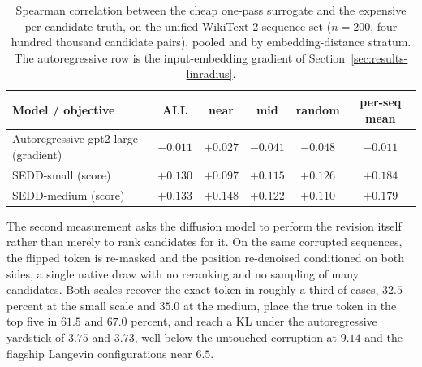\begin{table}[htbp]
    \centering
    \small
    \setlength{\tabcolsep}{4pt}
    \begin{tabular}{lccccc}
        \toprule
        Model / objective & ALL & near & mid & random & per-seq mean \\
        \midrule
        Autoregressive gpt2-large (gradient) & $-0.011$ & $+0.027$ & $-0.041$ & $-0.048$ & $-0.011$ \\
        SEDD-small (score) & $+0.130$ & $+0.097$ & $+0.115$ & $+0.126$ & $+0.184$ \\
        SEDD-medium (score) & $+0.133$ & $+0.148$ & $+0.122$ & $+0.110$ & $+0.179$ \\
        \bottomrule
    \end{tabular}
    \caption[Linearization correlation, autoregressive gradient against diffusion score.]{Spearman correlation between the cheap one-pass surrogate and the expensive per-candidate truth, on the unified WikiText-2 sequence set ($n=200$, four hundred thousand candidate pairs), pooled and by embedding-distance stratum. The autoregressive row is the input-embedding gradient of Section~\ref{sec:results-linradius}.}
    \label{tab:diffusion-lin}
\end{table}

The second measurement asks the diffusion model to perform the revision itself rather than merely to rank candidates for it. On the same corrupted sequences, the flipped token is re-masked and the position re-denoised conditioned on both sides, a single native draw with no reranking and no sampling of many candidates. Both scales recover the exact token in roughly a third of cases, $32.5$ percent at the small scale and $35.0$ at the medium, place the true token in the top five in $61.5$ and $67.0$ percent, and reach a KL under the autoregressive yardstick of $3.75$ and $3.73$, well below the untouched corruption at $9.14$ and the flagship Langevin configurations near $6.5$. %

